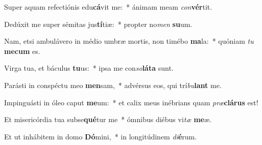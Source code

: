 \item Super aquam refectiónis edu\textbf{cá}vit me:~* ánimam meam \textit{con}\textbf{vér}tit.
\item Dedúxit me super sémitas jus\textbf{tí}tiæ:~* propter no\textit{men} \textbf{su}um.
\item Nam, etsi ambulávero in médio umbræ mortis, non timébo \textbf{ma}la:~* quóniam \textit{tu} \textbf{me}\textbf{cum} es.
\item Virga tua, et báculus \textbf{tu}us:~* ipsa me con\textit{so}\textbf{lá}\textbf{ta} sunt.
\item Parásti in conspéctu meo \textbf{men}sam,~* advérsus eos, qui trí\textit{bu}\textbf{lant} me.
\item Impinguásti in óleo caput \textbf{me}um:~* et calix meus inébrians quam \textit{præ}\textbf{clá}\textbf{rus} est!
\item Et misericórdia tua subse\textbf{qué}tur me~* ómnibus diébus vi\textit{tæ} \textbf{me}æ.
\item Et ut inhábitem in domo \textbf{Dó}mini,~* in longitúdinem \textit{di}\textbf{é}rum.
